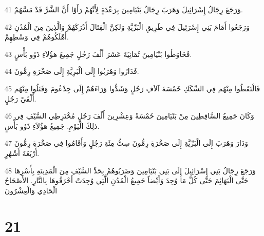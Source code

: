 \par 41 وَرَجَعَ رِجَالُ إِسْرَائِيلَ وَهَرَبَ رِجَالُ بَنْيَامِينَ بِرَعْدَةٍ لِأَنَّهُمْ رَأَوْا أَنَّ الشَّرَّ قَدْ مَسَّهُمْ.
\par 42 وَرَجَعُوا أَمَامَ بَنِي إِسْرَئِيلَ فِي طَرِيقِ الْبَرِّيَّةِ وَلكِنَّ الْقِتَالَ أَدْرَكَهُمْ وَالَّذِينَ مِنَ الْمُدُنِ أَهْلَكُوهُمْ فِي وَسْطِهِمْ.
\par 43 فَحَاوَطُوا بَنْيَامِينَ ثَمَانِيَةَ عَشَرَ أَلْفَ رَجُلٍ جَمِيعَ هؤُلاَءِ ذَوُو بَأْسٍ.
\par 44 فَدَارُوا وَهَرَبُوا إِلَى الْبَرِيَّةِ إِلَى صَخْرَةِ رِمُّونَ.
\par 45 فَالْتَقَطُوا مِنْهُم فِي السِّكَكِ خَمْسَةَ آلاَفِ رَجُلٍ وَشَدُّوا وَرَاءَهُمْ إِلَى جِدْعُومَ وَقَتَلُوا مِنْهُم أَلْفَيْ رَجُلٍ.
\par 46 وَكَانَ جَمِيعُ السَّاقِطِينَ مِنْ بَنْيَامِينَ خَمْسَةً وَعِشْرِينَ أَلْفَ رَجُلٍ مُخْتَرِطِي السَّيْفِ فِي ذلِكَ الْيَوْمِ. جَمِيعُ هؤُلاَءِ ذَوُو بَأْسٍ.
\par 47 وَدَارَ وَهَرَبَ إِلَى الْبَرِّيَّةِ إِلَى صَخْرَةِ رِمُّونَ سِتُّ مِئَةِ رَجُلٍ وَأَقَامُوا فِي صَخْرَةِ رِمُّونَ أَرْبَعَةَ أَشْهُرٍ.
\par 48 وَرَجَعَ رِجَالُ بَنِي إِسْرَائِيلَ إِلَى بَنِي بَنْيَامِينَ وَضَرَبُوهُمْ بِحَدِّ السَّيْفِ مِنَ الْمَدِينَةِ بِأَسْرِهَا حَتَّى الْبَهَائِمَ حَتَّى كُلَّ مَا وُجِدَ وَأَيْضاً جَمِيعُ الْمُدُنِ الَّتِي وُجِدَتْ أَحْرَقُوهَا بِالنَّارِ. الأَصْحَاحُ الْحَادِي وَالْعِشْرُونَ

\chapter{21}

